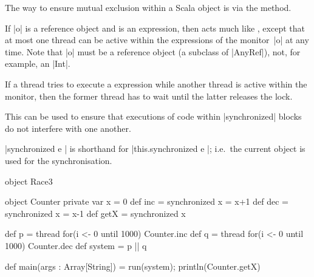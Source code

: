 




\begin{slide}

The way to ensure mutual exclusion within a Scala object  is via the
 method.  

If |o| is a reference object and  is an expression, then
 acts much like , except that at most
one thread can be active within the  expressions of the
monitor~|o| at any time.  Note that |o| must be a reference object (a subclass
of |AnyRef|), not, for example, an |Int|. 

If a thread tries to execute a 
expression while another thread is active within the monitor, then the former
thread has to wait until the latter releases the lock. 

This can be used to ensure that executions of code within
|synchronized| blocks do not interfere with one another. 

|synchronized{ e }| is shorthand for |this.synchronized{ e }|; i.e.~the
current object is used for the synchronisation.
\end{slide}


\begin{slide}

\begin{scala}
object Race3{
  object Counter{
    private var x = 0
    def inc = synchronized{ x = x+1 }
    def dec = synchronized{ x = x-1 }
    def getX = synchronized{ x }
  }

  def p = thread{ for(i <- 0 until 1000) Counter.inc }
  def q = thread{ for(i <- 0 until 1000) Counter.dec }
  def system = p || q

  def main(args : Array[String]) = { run(system); println(Counter.getX) }
}
\end{scala}
\end{slide}

